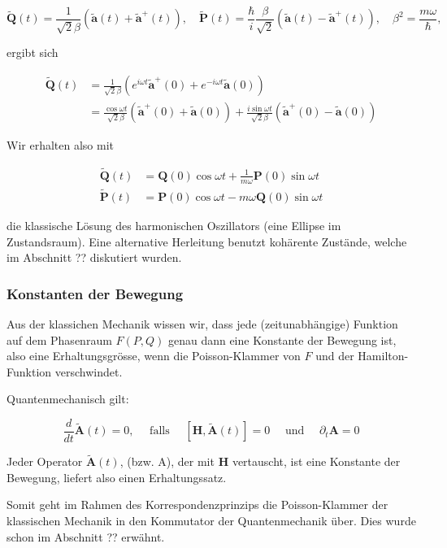 \documentclass[10pt, letterpaper]{article}
\begin{document}
$$
\tilde{\mathbf{Q}}(t)=\frac{1}{\sqrt{2} \beta}\left(\tilde{\mathbf{a}}(t)+\tilde{\mathbf{a}}^{+}(t)\right), \quad \tilde{\mathbf{P}}(t)=\frac{\hbar}{i} \frac{\beta}{\sqrt{2}}\left(\tilde{\mathbf{a}}(t)-\tilde{\mathbf{a}}^{+}(t)\right), \quad \beta^{2}=\frac{m \omega}{\hbar},
$$

ergibt sich

$$
\begin{aligned}
\tilde{\mathbf{Q}}(t) & =\frac{1}{\sqrt{2} \beta}\left(e^{i \omega t} \tilde{\mathbf{a}}^{+}(0)+e^{-i \omega t} \tilde{\mathbf{a}}(0)\right) \\
& =\frac{\cos \omega t}{\sqrt{2} \beta}\left(\tilde{\mathbf{a}}^{+}(0)+\tilde{\mathbf{a}}(0)\right)+\frac{i \sin \omega t}{\sqrt{2} \beta}\left(\tilde{\mathbf{a}}^{+}(0)-\tilde{\mathbf{a}}(0)\right)
\end{aligned}
$$

Wir erhalten also mit

$$
\begin{aligned}
\tilde{\mathbf{Q}}(t) & =\mathbf{Q}(0) \cos \omega t+\frac{1}{m \omega} \mathbf{P}(0) \sin \omega t \\
\tilde{\mathbf{P}}(t) & =\mathbf{P}(0) \cos \omega t-m \omega \mathbf{Q}(0) \sin \omega t
\end{aligned}
$$

die klassische Lösung des harmonischen Oszillators (eine Ellipse im Zustandsraum). Eine alternative Herleitung benutzt kohärente Zustände, welche im Abschnitt ?? diskutiert wurden.

\subsubsection*{Konstanten der Bewegung}
Aus der klassichen Mechanik wissen wir, dass jede (zeitunabhängige) Funktion auf dem Phasenraum $F(P, Q)$ genau dann eine Konstante der Bewegung ist, also eine Erhaltungsgrösse, wenn die Poisson-Klammer von $F$ und der Hamilton-Funktion verschwindet.

Quantenmechanisch gilt:

$$
\frac{d}{d t} \tilde{\mathbf{A}}(t)=0, \quad \text { falls } \quad[\mathbf{H}, \tilde{\mathbf{A}}(t)]=0 \quad \text { und } \quad \partial_{t} \mathbf{A}=0
$$

Jeder Operator $\tilde{\mathbf{A}}(t)$, (bzw. A), der mit $\mathbf{H}$ vertauscht, ist eine Konstante der Bewegung, liefert also einen Erhaltungssatz.

Somit geht im Rahmen des Korrespondenzprinzips die Poisson-Klammer der klassischen Mechanik in den Kommutator der Quantenmechanik über. Dies wurde schon im Abschnitt ?? erwähnt.
\end{document}
